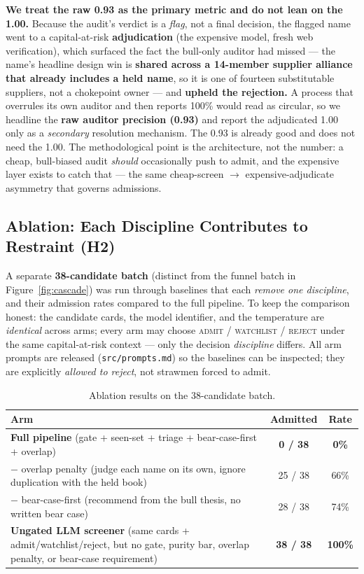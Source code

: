 \documentclass[11pt]{article}
\begin{document}
\textbf{We treat the raw 0.93 as the primary metric and do not lean on the 1.00.}
Because the audit's verdict is a \emph{flag}, not a final decision, the flagged
name went to a capital-at-risk \textbf{adjudication} (the expensive model, fresh
web verification), which surfaced the fact the bull-only auditor had missed ---
the name's headline design win is \textbf{shared across a 14-member supplier
alliance that already includes a held name}, so it is one of fourteen
substitutable suppliers, not a chokepoint owner --- and \textbf{upheld the
rejection.} A process that overrules its own auditor and then reports 100\%
would read as circular, so we headline the \textbf{raw auditor precision (0.93)}
and report the adjudicated 1.00 only as a \emph{secondary} resolution mechanism.
The 0.93 is already good and does not need the 1.00. The methodological point is
the architecture, not the number: a cheap, bull-biased audit \emph{should}
occasionally push to admit, and the expensive layer exists to catch that --- the
same cheap-screen $\to$ expensive-adjudicate asymmetry that governs admissions.

\subsection{Ablation: Each Discipline Contributes to Restraint (H2)}

A separate \textbf{38-candidate batch} (distinct from the funnel batch in
Figure~\ref{fig:cascade}) was run through baselines that each
\emph{remove one discipline}, and their admission rates compared to the full
pipeline. To keep the comparison honest: the candidate cards, the model
identifier, and the temperature are \emph{identical} across arms; every arm may
choose \textsc{admit} / \textsc{watchlist} / \textsc{reject} under the same
capital-at-risk context --- only the decision \emph{discipline} differs. All arm
prompts are released (\texttt{src/prompts.md}) so the baselines can be inspected;
they are explicitly \emph{allowed to reject}, not strawmen forced to admit.

\begin{table}[h]
\centering
\begin{tabularx}{\linewidth}{@{}Lcc@{}}
\toprule
\textbf{Arm} & \textbf{Admitted} & \textbf{Rate} \\
\midrule
\textbf{Full pipeline} (gate + seen-set + triage + bear-case-first + overlap)
  & \textbf{0 / 38} & \textbf{0\%} \\
$-$ overlap penalty (judge each name on its own, ignore duplication with the
  held book)
  & 25 / 38 & 66\% \\
$-$ bear-case-first (recommend from the bull thesis, no written bear case)
  & 28 / 38 & 74\% \\
\textbf{Ungated LLM screener} (same cards + admit/watchlist/reject, but no gate,
  purity bar, overlap penalty, or bear-case requirement)
  & \textbf{38 / 38} & \textbf{100\%} \\
\bottomrule
\end{tabularx}
\caption{Ablation results on the 38-candidate batch.}
\end{table}
\end{document}
